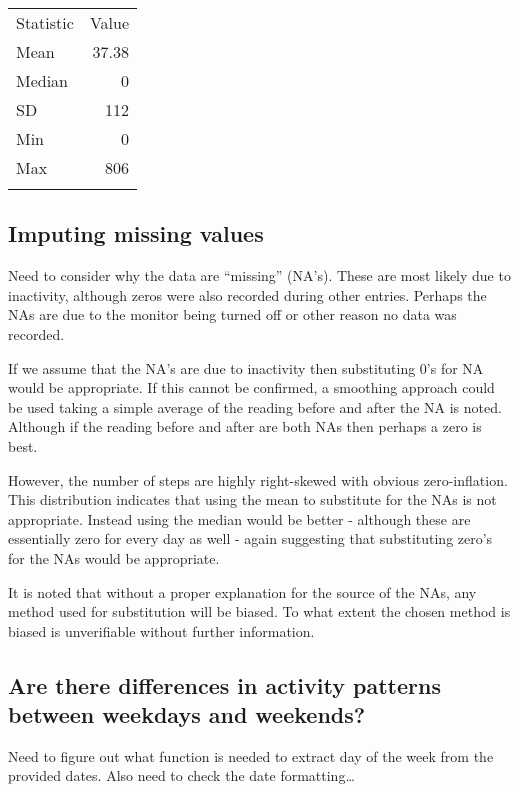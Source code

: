 \documentclass[]{article}
\begin{document}
\begin{longtable}[c]{@{}lr@{}}
\toprule\addlinespace
Statistic & Value
\\\addlinespace
\midrule\endhead
Mean & 37.38
\\\addlinespace
Median & 0
\\\addlinespace
SD & 112
\\\addlinespace
Min & 0
\\\addlinespace
Max & 806
\\\addlinespace
\bottomrule
\end{longtable}

\subsection{Imputing missing values}\label{imputing-missing-values}

Need to consider why the data are ``missing'' (NA's). These are most
likely due to inactivity, although zeros were also recorded during other
entries. Perhaps the NAs are due to the monitor being turned off or
other reason no data was recorded.

If we assume that the NA's are due to inactivity then substituting 0's
for NA would be appropriate. If this cannot be confirmed, a smoothing
approach could be used taking a simple average of the reading before and
after the NA is noted. Although if the reading before and after are both
NAs then perhaps a zero is best.

However, the number of steps are highly right-skewed with obvious
zero-inflation. This distribution indicates that using the mean to
substitute for the NAs is not appropriate. Instead using the median
would be better - although these are essentially zero for every day as
well - again suggesting that substituting zero's for the NAs would be
appropriate.

It is noted that without a proper explanation for the source of the NAs,
any method used for substitution will be biased. To what extent the
chosen method is biased is unverifiable without further information.

\subsection{Are there differences in activity patterns between weekdays
and
weekends?}\label{are-there-differences-in-activity-patterns-between-weekdays-and-weekends}

Need to figure out what function is needed to extract day of the week
from the provided dates. Also need to check the date formatting\ldots{}
\end{document}
